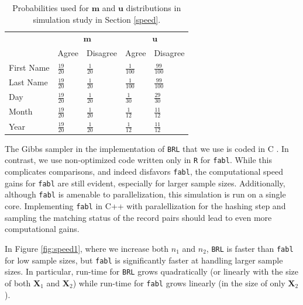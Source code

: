 \documentclass[ba]{imsart}
\begin{document}
	\begin{table}[t]
		\centering
		\begin{tabular}{lll|ll}
			\multicolumn{1}{c}{ } & \multicolumn{2}{c}{$\bm{m}$} & \multicolumn{2}{c}{$\bm{u}$} \\
			\cline{2-3} \cline{4-5}
			& Agree & Disagree & Agree & Disagree \\
			\hline
			First Name & $\frac{19}{20}$ & $\frac{1}{20}$ & $\frac{1}{100}$ &  $\frac{99}{100}$ \\ 
			Last Name & $\frac{19}{20}$ & $\frac{1}{20}$ & $\frac{1}{100}$ &  $\frac{99}{100}$ \\ 
			Day & $\frac{19}{20}$ & $\frac{1}{20}$ & $\frac{1}{30}$ &  $\frac{29}{30}$ \\ 
			Month & $\frac{19}{20}$ & $\frac{1}{20}$ & $\frac{1}{12}$ &  $\frac{11}{12}$ \\ 
			Year & $\frac{19}{20}$ & $\frac{1}{20}$ & $\frac{1}{12}$ &  $\frac{11}{12}$ \\  
			\hline
		\end{tabular}
		\caption{Probabilities used for $\bm{m}$ and $\bm{u}$ distributions in simulation study in Section \ref{speed}.}\label{Tab:distributions}
	\end{table}
	
	The Gibbs sampler in the implementation of \texttt{BRL} that we use is coded in C \citep{sadinle_bayesian_2017}. In contrast, we use non-optimized code written only in \texttt{R} for \texttt{fabl}.  While this complicates comparisons, and indeed disfavors \texttt{fabl}, the computational speed gains for \texttt{fabl} are still evident, especially for larger sample sizes.  Additionally, although \texttt{fabl} is amenable to parallelization, this simulation is run on a single core. Implementing \texttt{fabl} in C++ with paralellization for the hashing step and sampling the matching status of the record pairs should lead to even more computational gains.
	
	In Figure \ref{fig:speed1}, where we increase both $n_1$ and $n_2$, \texttt{BRL} is faster than \texttt{fabl} for low sample sizes, but \texttt{fabl} is significantly faster at handling larger sample sizes. In particular, run-time for \texttt{BRL} grows quadratically (or linearly with the size of both $\bm{X}_1$ and $\bm{X}_2$) while run-time for \texttt{fabl} grows linearly (in the size of only $\bm{X}_2$).
	
\end{document}
